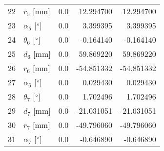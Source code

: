 \documentclass{standalone}%
\begin{document}
\begin{tabular}{llrrr}
22 &              $r_{5}$ [mm] &      0.0 &   12.294700 &   12.294700 \\
23 &  $\alpha_{5}$ [$\degree$] &      0.0 &    3.399395 &    3.399395 \\
24 &  $\theta_{6}$ [$\degree$] &      0.0 &   -0.164140 &   -0.164140 \\
25 &              $d_{6}$ [mm] &      0.0 &   59.869220 &   59.869220 \\
26 &              $r_{6}$ [mm] &      0.0 &  -54.851332 &  -54.851332 \\
27 &  $\alpha_{6}$ [$\degree$] &      0.0 &    0.029430 &    0.029430 \\
28 &  $\theta_{7}$ [$\degree$] &      0.0 &    1.702496 &    1.702496 \\
29 &              $d_{7}$ [mm] &      0.0 &  -21.031051 &  -21.031051 \\
30 &              $r_{7}$ [mm] &      0.0 &  -49.796060 &  -49.796060 \\
31 &  $\alpha_{7}$ [$\degree$] &      0.0 &   -0.646890 &   -0.646890 \\
\bottomrule
\end{tabular}
%
\end{document}
